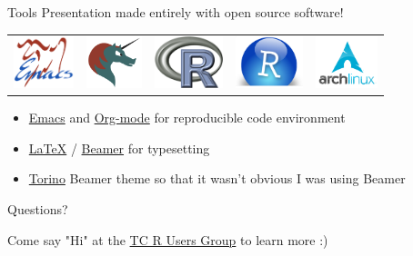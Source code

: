 \documentclass[sans,aspectratio=169,presentation,bigger,fleqn]{beamer}
\begin{document}
\begin{frame}[label=sec-26]{Tools}
Presentation made entirely with open source software!

\begin{center}
\begin{center}
\begin{tabular}{lllll}
\includegraphics[height=1.5cm]{./img/emacs.png} & \includegraphics[height=1.5cm]{./img/org-mode.png} & \includegraphics[height=1.5cm]{./img/r.png} & \includegraphics[height=1.5cm]{./img/r-studio.png} & \includegraphics[height=1.5cm]{./img/arch.png}\\
\end{tabular}
\end{center}
\end{center}

\begin{itemize}
\item \href{http://www.gnu.org/software/emacs/}{Emacs} and \href{http://orgmode.org/}{Org-mode} for reproducible code environment
\item \href{http://www.latex-project.org/}{\LaTeX} / \href{http://www.ctan.org/tex-archive/macros/latex/contrib/beamer/}{Beamer} for typesetting
\item \href{http://blog.barisione.org/2007-09/torino-a-pretty-theme-for-latex-beamer/}{Torino} Beamer theme so that it wasn't obvious I was using Beamer
\end{itemize}
\end{frame}

\begin{frame}[label=sec-27]{}
\LARGE
\begin{center}
Questions?

\vspace{1.5cm}

\normalsize
Come say "Hi" at the \href{http://www.meetup.com/twincitiesrug/}{TC R Users Group} to learn more :)
\end{center}
\end{frame}
\end{document}
